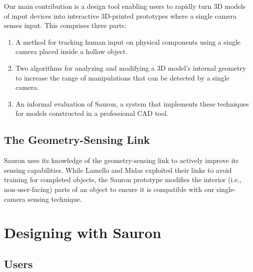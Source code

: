 Our main contribution is a design tool enabling users to rapidly turn 3D models of input devices into interactive 3D-printed prototypes where a single camera senses input. This comprises three parts:

\begin{enumerate}
\item A method for tracking human input on physical components using a single camera placed inside a hollow object.
\item Two algorithms for analyzing and modifying a 3D model's internal geometry to increase the range of manipulations that can be detected by a single camera.
\item An informal evaluation of Sauron, a system that implements these techniques for models constructed in a professional CAD tool.
\end{enumerate}


    \subsection{The Geometry-Sensing Link}
    Sauron uses its knowledge of the geometry-sensing link to actively improve its sensing capabilities. While Lamello and Midas exploited their links to avoid training for completed objects, the Sauron prototype modifies the interior (i.e., non-user-facing) parts of an object to ensure it is compatible with our single-camera sensing technique.

\section{Designing with Sauron}

    \subsection{Users}
    
